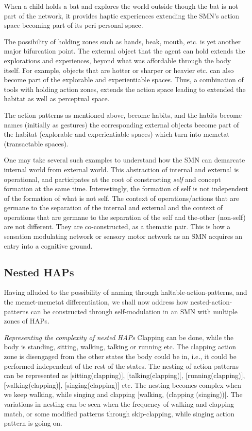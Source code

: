 {{{{{When a child holds a bat and explores the world outside though the bat is not part of the network, it provides haptic experiences extending the SMN's action space becoming part of its peri-personal space. 

The possibility of holding zones such as hands, beak, mouth, etc. is yet another major bifurcation point. The external object that the agent can hold extends the explorations and experiences, beyond what was affordable through the body itself. For example, objects that are hotter or sharper or heavier etc. can also become part of the explorable and experientiable spaces. Thus, a combination of tools with holding action zones, extends the action space leading to extended the habitat as well as perceptual space. 

The action patterns as mentioned above, become habits, and the habits become names (initially as gestures) the corresponding external objects become part of the habitat (explorable and experientiable spaces) which turn into memetat (transactable spaces). 

One may take several such examples to understand how the SMN can demarcate internal world from external world. This abstraction of internal and external is operational, and participates at the root of constructing \textit{self} and concept formation at the same time. Interestingly, the formation of self is not independent of the formation of what is not self. The context of operations/actions that are germane to the separation of the internal and external and the context of operations that are germane to the separation of the self and the-other (non-self) are not different. They are co-constructed, as a thematic pair. This is how a sensation modulating network or sensory motor network as an SMN acquires an entry into a cognitive ground. 

\subsection{Nested HAPs}

Having alluded to the possibility of naming through haltable-action-patterns, and the memet-memetat differentiation, we shall now address how nested-action-patterns can be constructed through self-modulation in an SMN with multiple zones of HAPs. 

\emph{Representing the complexity of nested HAPs} Clapping can be done, while the body is standing, sitting, walking, talking or running etc. The clapping action zone is disengaged from the other states the body could be in, i.e., it could be performed independent of the rest of the states. The nesting of action patterns can be represented as [sitting(clapping)],  [talking(clapping)],  [running(clapping)],  [walking(clapping)],  [singing(clapping)] etc. The nesting becomes complex when we keep walking, while singing and clapping [walking, (clapping (singing))]. The variations in nesting can be seen when the frequency of walking and clapping match, or some modified patterns through skip-clapping, while singing action pattern is going on. 

}}}}}
